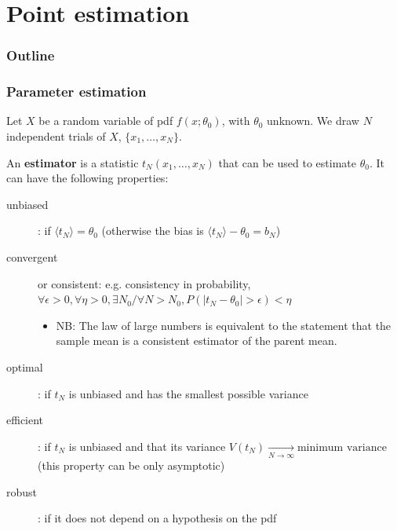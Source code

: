 \documentclass[9pt]{beamer}
\begin{document}
\section{Point estimation}

\begin{frame}
 \frametitle{Outline}
 
 \tableofcontents[current]
\end{frame}


\begin{frame}
 \frametitle{Parameter estimation}
 
 Let $X$ be a random variable of pdf $f(x;\theta_0)$, with $\theta_0$ unknown. We draw $N$ independent trials of $X$, $\{x_1,\dots,x_N\}$.
 
 
 An \textbf{estimator} is a statistic $t_N(x_1,\dots,x_N)$ that can be used to estimate $\theta_0$. It can have the following properties:
 
 \begin{description}
  \item[unbiased]: if $\langle t_N \rangle = \theta_0$ (otherwise the bias is $\langle t_N \rangle - \theta_0 = b_N$)
  \item[convergent] or consistent: e.g. consistency in probability, $\forall \epsilon>0, \forall \eta>0, \exists N_0 / \forall N>N_0, P(|t_N - \theta_0|>\epsilon)<\eta$
  \begin{itemize}
   \item NB: The law of large numbers is equivalent to the statement that the sample mean is a consistent estimator of the parent mean.
  \end{itemize}
  \item[optimal]: if $t_N$ is unbiased and has the smallest possible variance
  \item[efficient]: if $t_N$ is unbiased and that its variance $V(t_N) \xrightarrow[N\to\infty]{} \text{minimum variance}$ (this property can be only asymptotic)
  \item[robust]: if it does not depend on a hypothesis on the pdf
 \end{description}

\end{frame}
\end{document}
